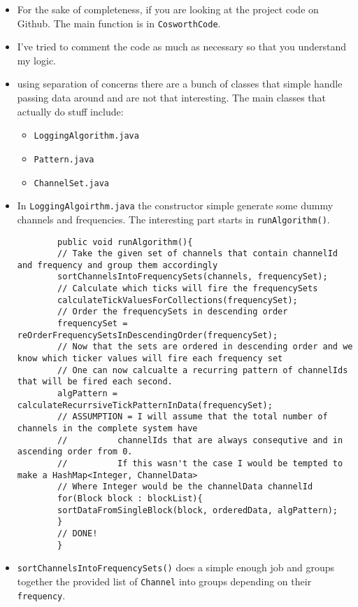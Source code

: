 \documentclass{article}
\begin{document}
	\begin{itemize}
		\item For the sake of completeness, if you are looking at the project code on Github. The main function is in \texttt{CosworthCode}.
		\item I've tried to comment the code as much as necessary so that you understand my logic.
		\item using separation of concerns there are a bunch of classes that simple handle passing data around and are not that interesting. The main classes that actually do stuff include:
		\begin{itemize}
			\item \texttt{LoggingAlgorithm.java}
			\item \texttt{Pattern.java}
			\item \texttt{ChannelSet.java}
		\end{itemize}
		\item In \texttt{LoggingAlgoirthm.java} the constructor simple generate some dummy channels and frequencies. The interesting part starts in \texttt{runAlgorithm()}.
		\begin{lstlisting}
		public void runAlgorithm(){
		// Take the given set of channels that contain channelId and frequency and group them accordingly
		sortChannelsIntoFrequencySets(channels, frequencySet);
		// Calculate which ticks will fire the frequencySets
		calculateTickValuesForCollections(frequencySet);
		// Order the frequencySets in descending order
		frequencySet = reOrderFrequencySetsInDescendingOrder(frequencySet);
		// Now that the sets are ordered in descending order and we know which ticker values will fire each frequency set
		// One can now calcualte a recurring pattern of channelIds that will be fired each second.
		algPattern = calculateRecurrsiveTickPatternInData(frequencySet);
		// ASSUMPTION = I will assume that the total number of channels in the complete system have 
		//          channelIds that are always consequtive and in ascending order from 0.
		//          If this wasn't the case I would be tempted to make a HashMap<Integer, ChannelData>
		// Where Integer would be the channelData channelId
		for(Block block : blockList){
		sortDataFromSingleBlock(block, orderedData, algPattern);
		}
		// DONE!
		}
		\end{lstlisting}
		\item \texttt{sortChannelsIntoFrequencySets()} does a simple enough job and groups together the provided list of \texttt{Channel} into groups depending on their \texttt{frequency}.

\end{itemize}
\end{document}
